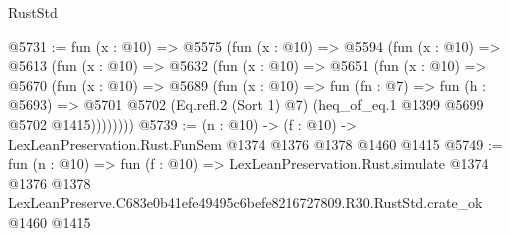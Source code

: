 \begin{lexlean}{RustStd}
\begin{coremodule}
@5731 := fun (x : @10) =>
  @5575
    (fun (x : @10) =>
    @5594
      (fun (x : @10) =>
      @5613
        (fun (x : @10) =>
        @5632
          (fun (x : @10) =>
          @5651
            (fun (x : @10) =>
            @5670
              (fun (x : @10) =>
              @5689
                (fun (x : @10) =>
                fun (fn : @7) =>
                fun (h : @5693) =>
                @5701 @5702 (Eq.refl.{2} (Sort 1) @7) (heq_of_eq.{1} @1399 @5699 @5702 @1415))))))))
@5739 := (n : @10) -> (f : @10) -> LexLeanPreservation.Rust.FunSem @1374 @1376 @1378 @1460 @1415
@5749 := fun (n : @10) =>
  fun (f : @10) =>
  LexLeanPreservation.Rust.simulate
    @1374
    @1376
    @1378
    LexLeanPreserve.C683e0b41efe49495c6befe8216727809.R30.RustStd.crate_ok
    @1460
    @1415
\end{coremodule}
\end{lexlean}

